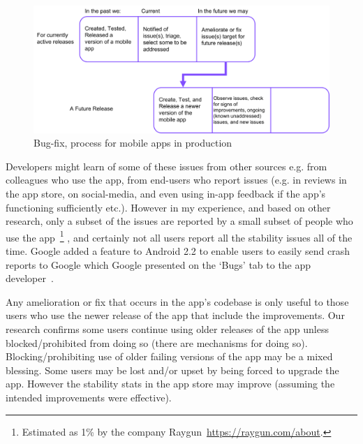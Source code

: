 \begin{figure}[!htbp]
    \centering
    \includegraphics[width=13cm]{images/my/production-bug-fix-process-for-mobile-apps.png}
    \caption{Bug-fix, process for mobile apps in production}
    \label{fig:my:bug-fix-process-for-mobile-apps-in-prod}
\end{figure}


Developers might learn of some of these issues from other sources e.g. from colleagues who use the app, from end-users who report issues (e.g. in reviews in the app store, on social-media, and even using in-app feedback if the app's functioning sufficiently etc.). 
However in my experience, and based on other research, only a subset of the issues are reported by a small subset of people who use the app~\footnote{Estimated as 1\% by the company Raygun~\url{https://raygun.com/about}.} %
, and certainly not all users report all the stability issues all of the time. Google added a feature to Android 2.2 to enable users to easily send crash reports to Google which Google presented on the `Bugs' tab to the app developer~\citep{androiddevelopersblog2012_android_application_error_reports}.

Any amelioration or fix that occurs in the app's codebase is only useful to those users who use the newer release of the app that include the improvements. Our research confirms some users continue using older releases of the app unless blocked/prohibited from doing so (there are mechanisms for doing so). Blocking/prohibiting use of older failing versions of the app may be a mixed blessing. Some users may be lost and/or upset by being forced to upgrade the app. However the stability stats in the app store may improve (assuming the intended improvements were effective).


